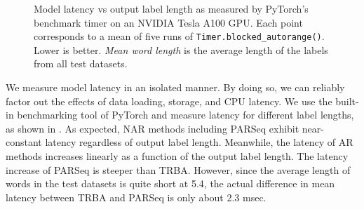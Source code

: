 \begin{figure}[htbp]
  \centering


  \caption[Model latency vs output label length.]{Model latency vs output label length as measured by PyTorch's benchmark timer on an NVIDIA Tesla A100 GPU. Each point corresponds to a mean of five runs of \texttt{Timer.blocked\_autorange()}. Lower is better. \textit{Mean word length} is the average length of the labels from all test datasets.}
  \label{fig:runtime}
\end{figure}

We measure model latency in an isolated manner. By doing so, we can reliably factor out the effects of data loading, storage, and CPU latency. We use the built-in benchmarking tool of PyTorch and measure latency for different label lengths, as shown in . As expected, NAR methods including PARSeq exhibit near-constant latency regardless of output label length. Meanwhile, the latency of AR methods increases linearly as a function of the output label length. The latency increase of PARSeq is steeper than TRBA. However, since the average length of words in the test datasets is quite short at 5.4, the actual difference in mean latency between TRBA and PARSeq is only about 2.3 msec.

